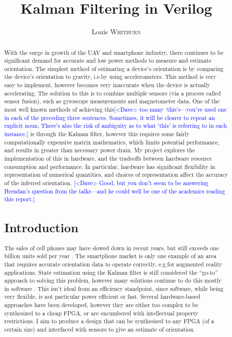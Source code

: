 \documentclass[12pt]{article}
\title{Kalman Filtering in Verilog}
\author{Louis \textsc{Whitburn}}
\newcommand{\note}[2][red]{\textcolor{#1}{#2}}
\newcommand{\notedme}[1]{\note[blue]{[<Dave> #1]}}
\begin{document}
\maketitle

\begin{abstract}

With the surge in growth of the UAV and smartphone industry, there continues to be significant demand for accurate and low power methods to measure and estimate orientation. The simplest method of estimating a device's orientation is by comparing the device's orientation to gravity, i.e.\@ by using accelerometers. This method is very easy to implement, however becomes very inaccurate when the device is actually accelerating. The solution to this is to combine multiple sensors (via a process called sensor fusion), such as gyroscope measurements and magnetometer data. One of the most well known methods of achieving this\notedme{too many `this's---you've used one in each of the preceding three sentences. Sometimes, it will be clearer to repeat an explicit noun. There's also the risk of ambiguity as to what `this' is referring to in each instance.} is through the Kalman filter, however this requires some fairly computationally expensive matrix mathematics, which limits potential performance, and results in greater than necessary power drain. My project explores the implementation of this in hardware, and the tradeoffs between hardware resource consumption and performance. In particular, hardware has significant flexibility in representation of numerical quantities, and choices of representation affect the accuracy of the inferred orientation.
\notedme{Good, but you don't seem to be answering Brendan's question from the talks---and he could well be one of the academics reading this report.}

\section{Introduction}

The sales of cell phones may have slowed down in recent years, but still exceeds one billion units sold per year \cite{Mongardini_2020}. The smartphone market is only one example of an area that requires accurate orientation data to operate correctly, e.g.\@ for augmented reality applications. State estimation using the Kalman filter is still considered the ``go-to'' approach to solving this problem, however many solutions continue to do this mostly in software \cite{ayub_2012}. This isn't ideal from an efficiency standpoint, since software, while being very flexible, is not particular power efficient or fast. Several hardware-based approaches have been developed, however they are either too complex \cite{mills_2016} to be synthesized to a cheap FPGA, or are encumbered with intellectual property restrictions. I aim to produce a design that can be synthesised to any FPGA (of a certain size) and interfaced with sensors to give an estimate of orientation.


\end{abstract}
\end{document}
